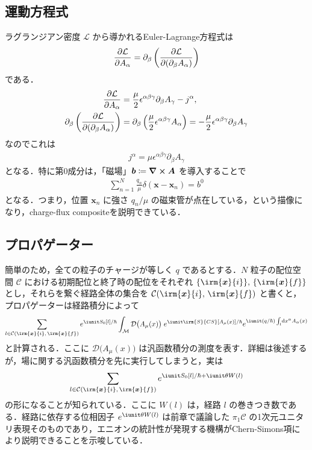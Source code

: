 \documentclass[TQFT_main]{subfiles}
\begin{document}
\subsection{運動方程式}

ラグランジアン密度 $\mathcal{L}$ から導かれるEuler-Lagrange方程式は
\begin{align}
    \pdv{\mathcal{L}}{A_\alpha} = \partial_\beta \left( \pdv{\mathcal{L}}{(\partial_\beta A_\alpha)} \right) 
\end{align}
である．
\begin{align}
    \pdv{\mathcal{L}}{A_\alpha} 
    &= \frac{\mu}{2} \epsilon^{\alpha \beta\gamma }\partial_\beta A_\gamma - j^\alpha, \\
    \partial_\beta \left( \pdv{\mathcal{L}}{(\partial_\beta A_\alpha)} \right) 
    &= \partial_\beta \left( \frac{\mu}{2} \epsilon^{\alpha \beta \gamma} A_\alpha \right) = -\frac{\mu}{2} \epsilon^{\alpha\beta\gamma} \partial_{\beta} A_\gamma
\end{align}
なのでこれは
\begin{align}
    j^\alpha = \mu \epsilon^{\alpha\beta\gamma} \partial_\beta A_\gamma
\end{align}
となる．特に第0成分は，「磁場」$\bm{b} \coloneqq \curl{\bm{A}}$ を導入することで
\begin{align}
    \sum_{n=1}^N \frac{q_n}{\mu} \delta (\bm{x} - \bm{x}_n) = b^0
\end{align}
となる．つまり，位置 $\bm{x}_n$ に強さ $q_n / \mu$ の磁束管が点在している，という描像になり，charge-flux compositeを説明できている．

\subsection{プロパゲーター}

簡単のため，全ての粒子のチャージが等しく $q$ であるとする．$N$ 粒子の配位空間 $\mathcal{C}$ における初期配位と終了時の配位をそれぞれ $\{\irm{\bm{x}}{i}\},\, \{\irm{\bm{x}}{f}\}$ とし，それらを繋ぐ経路全体の集合を $\mathcal{C}(\irm{\bm{x}}{i},\, \irm{\bm{x}}{f})$ と書くと，プロパゲーターは経路積分によって
\begin{align}
    \sum_{l \in \mathcal{C}(\irm{\bm{x}}{i},\, \irm{\bm{x}}{f})} e^{\iunit S_0[l]/\hbar } \int_{\mathcal{M}} \mathcal{D}\bigl( A_\mu (x)\bigr)\; e^{\iunit \irm{S}{CS}[A_\mu (x)]/\hbar} e^{\iunit (q/\hbar) \int_l \dd{x^\alpha} A_\alpha (x) }
\end{align}
と計算される．ここに $\mathcal{D}\bigl(A_\mu (x)\bigr)$ は汎函数積分の測度を表す．詳細は後述するが，場に関する汎函数積分を先に実行してしまうと，実は
\begin{align}
    \sum_{l \in \mathcal{C}(\irm{\bm{x}}{i},\, \irm{\bm{x}}{f})} e^{\iunit S_0 [l] /\hbar + \iunit \theta W(l)}
\end{align}
の形になることが知られている．ここに $W(l)$ は，経路 $l$ の巻きつき数である．経路に依存する位相因子 $e^{\iunit \theta W(l)}$ は前章で議論した $\pi_1 \mathcal{C}$ の1次元ユニタリ表現そのものであり，エニオンの統計性が発現する機構がChern-Simons項により説明できることを示唆している．
\end{document}
